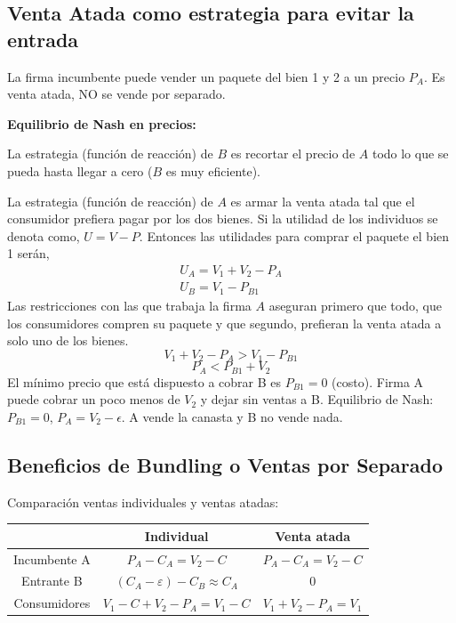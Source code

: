 \documentclass{exam}
\begin{document}
\subsection*{Venta Atada como estrategia para evitar la entrada}
La firma incumbente puede vender un paquete del bien 1 y 2 a un precio $P_A$. Es venta atada, NO se vende por separado. 

\textbf{Equilibrio de Nash en precios:} 

La estrategia (función de reacción) de $B$ es recortar el precio de $A$ todo lo que se pueda hasta llegar a cero ($B$ es muy eficiente).

La estrategia (función de reacción) de $A$ es armar la venta atada tal que el consumidor prefiera pagar por los dos bienes. Si la utilidad de los individuos se denota como, $U = V - P$. Entonces las utilidades para comprar el paquete el bien 1 serán, 
\begin{align*}
    U_A = V_1 + V_2 - P_A \\
    U_B = V_1 - P_{B1}
\end{align*}
Las restricciones con las que trabaja la firma $A$ aseguran primero que todo, que los consumidores compren su paquete y que segundo, prefieran la venta atada a solo uno de los bienes.
\[
V_1 + V_2 - P_A > V_1 - P_{B1}
\]
\[
P_A < P_{B1} + V_2
\]
El mínimo precio que está dispuesto a cobrar B es $P_{B1} = 0$ (costo). Firma A puede cobrar un poco menos de $V_2$ y dejar sin ventas a B. Equilibrio de Nash: $P_{B1} = 0$, $P_A = V_2 - \epsilon$. A vende la canasta y B no vende nada.

\subsection*{Beneficios de Bundling o Ventas por Separado}
Comparación ventas individuales y ventas atadas:

\begin{center}
\begin{tabular}{|c|c|c|}
\hline
 & Individual & Venta atada \\
\hline
Incumbente A & $P_A - C_A = V_2 - C$ & $P_A - C_A = V_2 - C$ \\
\hline
Entrante B & $(C_A - \varepsilon) - C_B \approx C_A$ & $0$ \\
\hline
Consumidores & $V_1 - C + V_2 - P_A = V_1-C$ & $V_1 + V_2 - P_A = V_1$ \\
\hline
\end{tabular}
\end{center}
\end{document}
